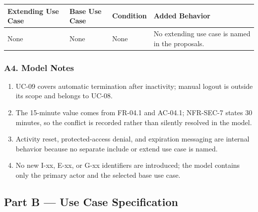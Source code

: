 \documentclass[12pt]{article}
\renewcommand{\baselinestretch}{1.5}
\begin{document}
\begingroup
\small
\renewcommand{\baselinestretch}{1.0}\selectfont
\renewcommand{\arraystretch}{1.15}
\setlength{\tabcolsep}{6pt}
\begin{longtable}{|>{\raggedright\arraybackslash}p{}|>{\raggedright\arraybackslash}p{}|>{\raggedright\arraybackslash}p{}|>{\raggedright\arraybackslash}p{}|}
\hline
\textbf{Extending Use Case} & \textbf{Base Use Case} & \textbf{Condition} & \textbf{Added Behavior} \\ \hline
\endhead
None & None & None & No extending use case is named in the proposals. \\ \hline
\end{longtable}
\endgroup
\par\medskip

\hypertarget{sec:a4-model-notes}{}
\subsubsection*{A4. Model Notes}
\par\medskip

\begin{enumerate}
\item UC-09 covers automatic termination after inactivity; manual logout is outside its scope and belongs to UC-08.
\item The 15-minute value comes from FR-04.1 and AC-04.1; NFR-SEC-7 states 30 minutes, so the conflict is recorded rather than silently resolved in the model.
\item Activity reset, protected-access denial, and expiration messaging are internal behavior because no separate include or extend use case is named.
\item No new I-xx, E-xx, or G-xx identifiers are introduced; the model contains only the primary actor and the selected base use case.
\end{enumerate}
\par\medskip

\hypertarget{sec:part-b-use-case-specification}{}
\subsection*{Part B --- Use Case Specification}
\par\medskip

\hypertarget{sec:b1-brief-description}{}
\end{document}
